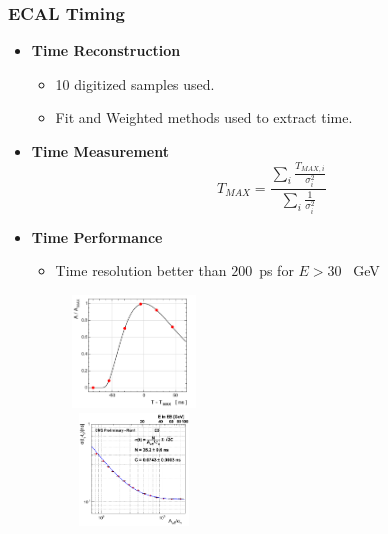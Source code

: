 \documentclass{beamer}
\begin{document}
\begin{frame}
\frametitle{ECAL Timing}
 \begin{minipage}[b]{0.8\paperwidth}
  \begin{itemize}
   \item\textcolor{UMN@Maroon}{\textbf{Time Reconstruction}} 
      \begin{itemize}
        \item 10 digitized samples used.
        \item Fit and Weighted methods used to extract time.
      \end{itemize}   
   \item \textcolor{UMN@Maroon}{\textbf{Time Measurement}}
 $$  T_{MAX} = \frac{{\displaystyle\sum_{i}} \frac{T_{MAX,i} }{\sigma_i^2} }{ {\displaystyle\sum_{i}} \frac{1}{\sigma_i^2} } $$
  \end{itemize}   
\end{minipage}
 
 \begin{minipage}[b]{0.8\paperwidth}
   \begin{itemize}
    \item \textcolor{UMN@Maroon}{\textbf{Time Performance}}
    \begin{itemize}
     \item  Time resolution better than $200$~ps for $E > 30$ ~GeV
    \end{itemize}
     
   \end{itemize}
 \end{minipage}
 \mbox{\includegraphics[height=3.0cm,width=0.50\textwidth]            {THESISPLOTS/AmplitudeVsTMax.png}
      \includegraphics[height=3.0cm,width=0.50\textwidth]            {THESISPLOTS/NeigboMethodECALTimeRes.png}}
\end{frame}
\end{document}
